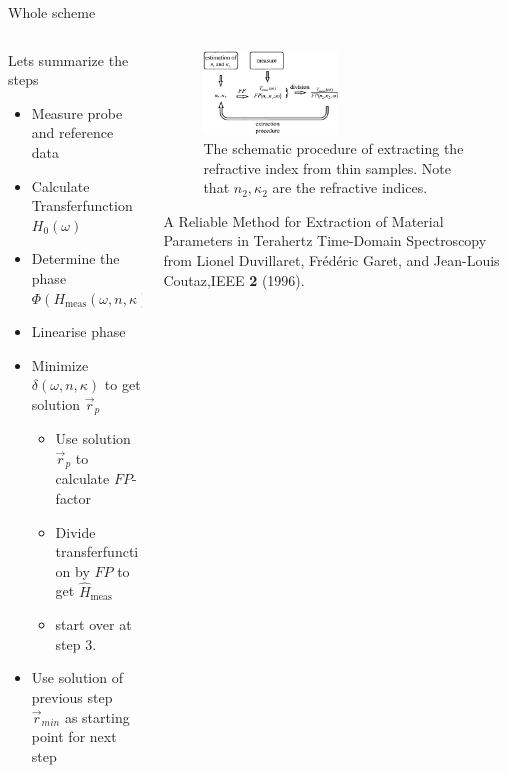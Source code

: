 \documentclass[aspectratio=1610, 9pt]{beamer}
\begin{document}
\begin{frame}{Whole scheme}
  \begin{columns}
    \begin{column}{0.5\textwidth}
      Lets summarize the steps
      \begin{itemize}
        \item[1.] Measure probe and reference data 
        \item[2.] Calculate Transferfunction $H_0(\omega)$
        \item[3.] Determine the phase $\Phi(H_\text{meas}(\omega, n, \kappa))$
        \item[4.] Linearise phase
        \item[5.] Minimize $\delta(\omega, n, \kappa)$ to get solution $\vec{r}_p$
        \begin{itemize}
          \item[a)] Use solution $\vec{r}_p$ to calculate $FP$-factor 
          \item[b)] Divide transferfunction by $FP$ to get $\hat{H}_\text{meas}$
          \item[c)] start over at step 3. 
        \end{itemize}
        \item[6.] Use solution of previous step $\vec{r}_{min}$ as starting point for next step 
      \end{itemize}
    \end{column}
    \begin{column}{0.5\textwidth}
      \begin{figure}
        \includegraphics[width=0.5\textwidth]{images/procedure_fp.jpg}
        \caption{The schematic procedure of extracting the refractive index from thin samples. Note that $n_2, \kappa_2$ are the refractive indices.}
      \end{figure}
      \textcolor{tugreen}{A Reliable Method for Extraction of Material Parameters in Terahertz Time-Domain Spectroscopy} from Lionel Duvillaret, Frédéric Garet, and Jean-Louis Coutaz,IEEE \textbf{2} (1996).
  \end{column}
\end{columns}

\end{frame}
\end{document}

